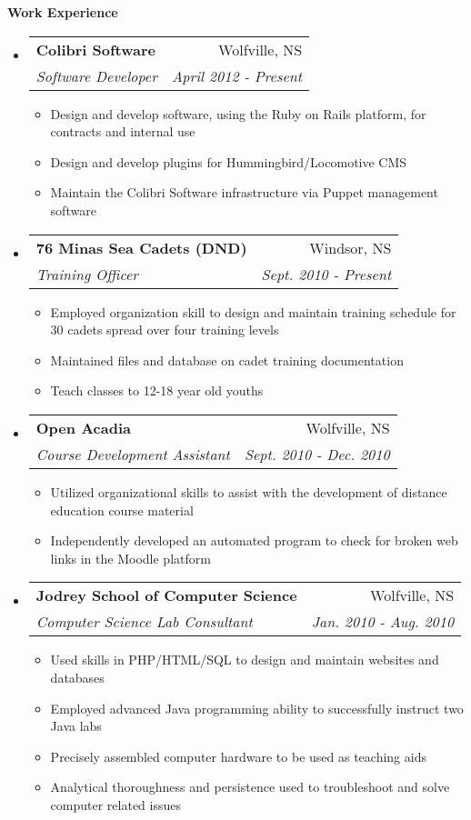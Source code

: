 \documentclass[letterpaper,11pt]{article}
\makeatletter
\newcommand{\resitem}[1]{\item #1 \vspace{-2pt}}
\newcommand{\resheading}[1]{{\large \colorbox{mygrey}{\begin{minipage}{\textwidth}{\textbf{#1 \vphantom{p\^{E}} }}\end{minipage}} }}
\newcommand{\ressubheading}[4]{
\begin{tabular*}{6.5in}{l@{\extracolsep{\fill}}r}
        \textbf{#1} & #2 \\
        \textit{#3} & \textit{#4} \\
\end{tabular*}\vspace{-6pt}}
\makeatother
\begin{document}
\newpage
\mywebheader
\resheading{Work Experience} %
    \begin{itemize}
        \item[]
            \ressubheading{Colibri Software}{Wolfville, NS}{Software Developer}{April 2012 - Present}
                \begin{itemize}
                    \resitem{Design and develop software, using the Ruby on Rails platform, for contracts and internal use}
                    \resitem{Design and develop plugins for Hummingbird/Locomotive CMS}
                    \resitem{Maintain the Colibri Software infrastructure via Puppet management software}
                \end{itemize}
        \item[]
            \ressubheading{76 Minas Sea Cadets (DND)}{Windsor, NS}{Training Officer}{Sept. 2010 - Present}
                \begin{itemize}
                    \resitem{Employed organization skill to design and maintain training schedule for 30 cadets spread over four training levels}
                    \resitem{Maintained files and database on cadet training documentation}
                    \resitem{Teach classes to 12-18 year old youths}
                \end{itemize}
        \item[]
            \ressubheading{Open Acadia}{Wolfville, NS}{Course Development Assistant}{Sept. 2010 - Dec. 2010}
                \begin{itemize}
                    \resitem{Utilized organizational skills to assist with the development of distance education course material}
                    \resitem{Independently developed an automated program to check for broken web links in the Moodle platform}
                \end{itemize}
        \item[]
            \ressubheading{Jodrey School of Computer Science}{Wolfville, NS}{Computer Science Lab Consultant}{Jan. 2010 - Aug. 2010}
                \begin{itemize}
                    \resitem{Used skills in PHP/HTML/SQL to design and maintain websites and databases}
                    \resitem{Employed advanced Java programming ability to successfully instruct two Java labs}
                    \resitem{Precisely assembled computer hardware to be used as teaching aids}
                    \resitem{Analytical thoroughness and persistence used to troubleshoot and solve computer related issues}

\end{itemize}
\end{itemize}
\end{document}
